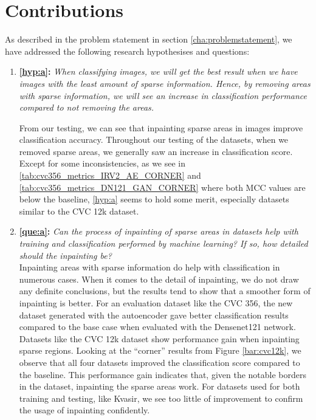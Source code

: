 \section{Contributions}
As described in the problem statement in section \ref{cha:problemstatement}, we have addressed the following research hypothesises and questions:
\begin{enumerate}

\item \textbf{\ref{hyp:a}:} \textit{When classifying images, we will get the best result when we have images with the least amount of sparse information. Hence, by removing areas with sparse information, we will see an increase in classification performance compared to not removing the areas.}

From our testing, we can see that inpainting sparse areas in images improve classification accuracy. Throughout our testing of the datasets, when we removed sparse areas, we generally saw an increase in classification score. Except for some inconsistencies, as we see in \ref{tab:cvc356_metrics_IRV2_AE_CORNER} and \ref{tab:cvc356_metrics_DN121_GAN_CORNER} where both MCC values are below the baseline, \ref{hyp:a} seems to hold some merit, especially datasets similar to the CVC 12k dataset. 
    


\item \textbf{\ref{que:a}:} \textit{ Can the process of inpainting of sparse areas in datasets help with training and classification performed by machine learning? If so, how detailed should the inpainting be?}\\ 
    
Inpainting areas with sparse information do help with classification in numerous cases. When it comes to the detail of inpainting, we do not draw any definite conclusions, but the results tend to show that a smoother form of inpainting is better.
For an evaluation dataset like the CVC 356, the new dataset generated with the autoencoder gave better classification results compared to the base case when evaluated with the Densenet121 network.
Datasets like the CVC 12k dataset show performance gain when inpainting sparse regions. Looking at the ``corner'' results from Figure \ref{bar:cvc12k}, we observe that all four datasets improved the classification score compared to the baseline.
This performance gain indicates that, given the notable borders in the dataset, inpainting the sparse areas work.
For datasets used for both training and testing, like Kvasir, we see too little of improvement to confirm the usage of inpainting confidently.
    



\end{enumerate}
